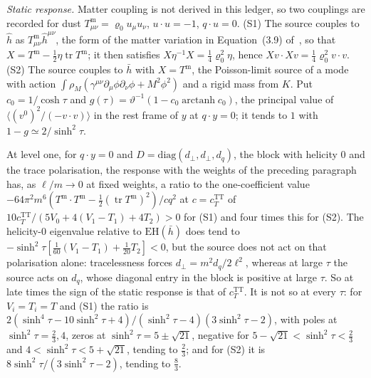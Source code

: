 \emph{Static response.} Matter coupling is not derived in this ledger, so two couplings are recorded for dust \(T^{\mathrm m}_{\mu\nu}=\varrho_0u_\mu u_\nu\), \(u\cdot u=-1\), \(q\cdot u=0\). (S1) The source couples to \(\hat h\) as \(T^{\mathrm m}_{\mu\nu}\hat h^{\mu\nu}\), the form of the matter variation in Equation~(3.9) of~\cite{Steinacker2026}, so that \(X=T^{\mathrm m}-\tfrac12\eta\operatorname{tr}T^{\mathrm m}\); it then satisfies \(X\eta^{-1}X=\tfrac14\varrho_0^2\eta\), hence \(Xv\cdot Xv=\tfrac14\varrho_0^2v\cdot v\). (S2) The source couples to \(\bar h\) with \(X=T^{\mathrm m}\), the Poisson-limit source of a mode with action \(\int\rho_M(\gamma^{\mu\nu}\partial_\mu\phi\partial_\nu\phi+M^2\phi^2)\) and a rigid mass from \(K\). Put \(c_0=1/\cosh\tau\) and \(g(\tau)=\vartheta^{-1}(1-c_0\operatorname{arctanh}c_0)\), the principal value of \(\langle(v^0)^2/(-v\cdot v)\rangle\) in the rest frame of \(y\) at \(q\cdot y=0\); it tends to \(1\) with \(1-g\simeq2/\sinh^2\tau\).

At level one, for \(q\cdot y=0\) and \(D=\mathrm{diag}(d_\perp,d_\perp,d_q)\), the block with helicity \(0\) and the trace polarisation, the response with the weights of the preceding paragraph has, as \(\ell/m\to0\) at fixed weights, a ratio to the one-coefficient value \(-64\pi^2m^6(T^{\mathrm m}\cdot T^{\mathrm m}-\tfrac12(\operatorname{tr}T^{\mathrm m})^2)/cq^2\) at \(c=c_T^{\mathrm{TT}}\) of \(10c_T^{\mathrm{TT}}/(5V_0+4(V_1-T_1)+4T_2)>0\) for (S1) and four times this for (S2). The helicity-\(0\) eigenvalue relative to \(\mathrm{EH}(\bar h)\) does tend to \(-\sinh^2\tau[\tfrac1{60}(V_1-T_1)+\tfrac1{20}T_2]<0\), but the source does not act on that polarisation alone: tracelessness forces \(d_\perp=m^2d_q/2\ell^2\), whereas at large \(\tau\) the source acts on \(d_q\), whose diagonal entry in the block is positive at large \(\tau\). So at late times the sign of the static response is that of \(c_T^{\mathrm{TT}}\). It is not so at every \(\tau\): for \(V_i=T_i=T\) and (S1) the ratio is \(2(\sinh^4\tau-10\sinh^2\tau+4)/(\sinh^2\tau-4)(3\sinh^2\tau-2)\), with poles at \(\sinh^2\tau=\tfrac23,4\), zeros at \(\sinh^2\tau=5\pm\sqrt{21}\), negative for \(5-\sqrt{21}<\sinh^2\tau<\tfrac23\) and \(4<\sinh^2\tau<5+\sqrt{21}\), tending to \(\tfrac23\); and for (S2) it is \(8\sinh^2\tau/(3\sinh^2\tau-2)\), tending to \(\tfrac83\).

